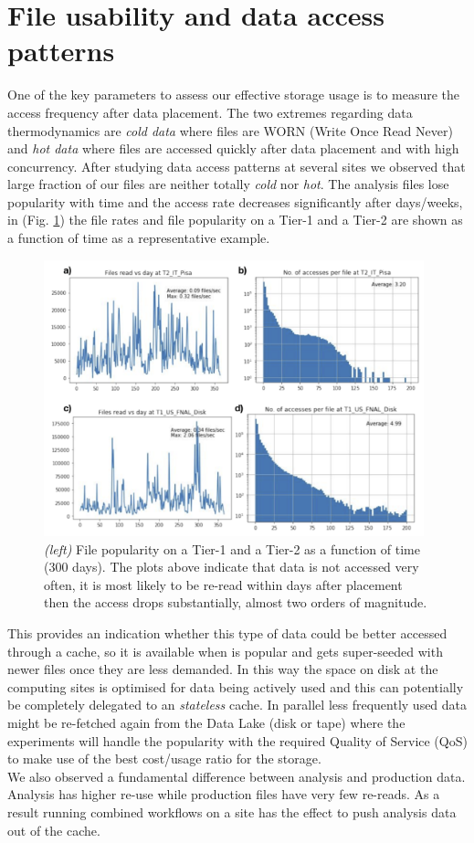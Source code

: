 \section{File usability and data access patterns}
One of the key parameters to assess our effective storage usage is to measure the access frequency after data placement. The two extremes regarding data thermodynamics are \emph{cold data} where files are WORN (Write Once Read Never) and \emph{hot data} where files are accessed quickly after data placement and with high concurrency. After studying data access patterns at several sites we observed that large fraction of our files are neither totally \emph{cold} nor \emph{hot}. The analysis files lose popularity with time and the access rate decreases significantly after days/weeks, in (Fig. \ref{access}) the file rates and file popularity on a Tier-1 and a Tier-2 are shown as a function of time as a representative example.

\begin{figure}[h]
  \centering
  \includegraphics[height=8cm]{dataaccess-chep2019.png}
  \caption{{\em (left)} File popularity on a Tier-1 and a Tier-2 as a function of time (300 days). The plots above indicate that data is not accessed very often, it is most likely to be re-read within days after placement then the access drops substantially, almost two orders of magnitude.}
  \label{access}
\end{figure}

This provides an indication whether this type of data could be better accessed through a cache, so it is available when is popular and gets super-seeded with newer files once they are less demanded. In this way the space on disk at the computing sites is optimised for data being actively used and this can potentially be completely delegated to an \emph{stateless} cache. In parallel less frequently used data might be re-fetched again from the Data Lake (disk or tape) where the experiments will handle the popularity with the required Quality of Service (QoS) to make use of the best cost/usage ratio for the storage.\\
We also observed a fundamental difference between analysis and production data. Analysis has higher re-use while production files have very few re-reads. As a result running combined workflows on a site has the effect to push analysis data out of the cache.

